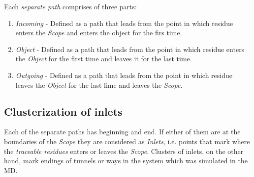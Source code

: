 \documentclass[a4paper,10pt,english]{sphinxmanual}
\begin{document}
Each \emph{separate path} comprises of three parts:
\begin{enumerate}
\item {} 
\emph{Incoming} - Defined as a path that leads from the point in which residue enters the \emph{Scope} and enters the object for the firs time.

\item {} 
\emph{Object} - Defined as a path that leads from the point in which residue enters the \emph{Object} for the first time and leaves it for the last time.

\item {} 
\emph{Outgoing} - Defined as a path that leads from the point in which residue leaves the \emph{Object} for the last lime and leaves the \emph{Scope}.

\end{enumerate}


\subsection{Clusterization of inlets}
\label{valve/valve_manual:clusterization-of-inlets}\label{valve/valve_manual:id3}
Each of the separate paths has beginning and end. If either of them are at the boundaries of the \emph{Scope} they are considered as \emph{Inlets}, i.e. points that mark where the \emph{traceable residues} enters or leaves the \emph{Scope}. Clusters of inlets, on the other hand, mark endings of tunnels or ways in the system which was simulated in the MD.
\end{document}
